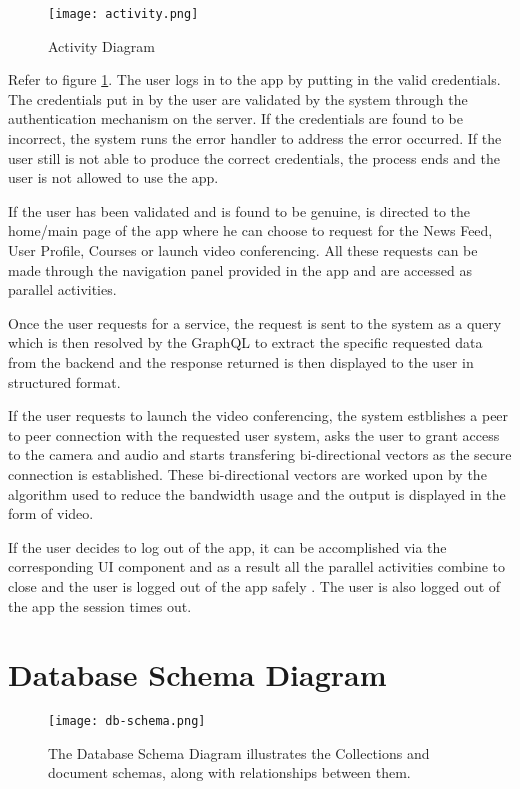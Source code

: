 \begin{figure}[h!]
    \begin{center}
        \texttt{[image: activity.png]}
    \end{center}
    \caption{Activity Diagram}
    \label{fig:activity}
\end{figure}

Refer to figure \ref{fig:activity}. The user logs in to the app by putting in the valid credentials.
The credentials put in by the user are validated by the system through the authentication mechanism on the server.
If the credentials are found to be incorrect, the system runs the error handler to address the error occurred.
If the user still is not able to produce the correct credentials, the process ends and the user is not allowed to use the app.

If the user has been validated and is found to be genuine, is directed to the home/main page of the app where he can choose to request for the News Feed, User Profile, Courses or launch video conferencing.
All these requests can be made through the navigation panel provided in the app and are accessed as parallel activities.

Once the user requests for a service, the request is sent to the system as a query which is then resolved by the GraphQL to extract the specific requested data from the backend and the response returned is then displayed to the user in structured format.

If the user requests to launch the video conferencing, the system estblishes a peer to peer connection with the requested user system, asks the user to grant access to the camera and audio and starts transfering bi-directional vectors as the secure connection is established.
These bi-directional vectors are worked upon by the algorithm used to reduce the bandwidth usage and the output is displayed in the form of video.

If the user decides to log out of the app, it can be accomplished via the corresponding UI component and as a result all the parallel activities combine to close and the user is logged out of the app safely .
The user is also logged out of the app the session times out.

\section{Database Schema Diagram}

\begin{figure}[h!]
    \centering
    \texttt{[image: db-schema.png]}
    \caption{The Database Schema Diagram illustrates the Collections and document schemas, 
    along with relationships between them.}
    \label{fig:schema}
\end{figure}

